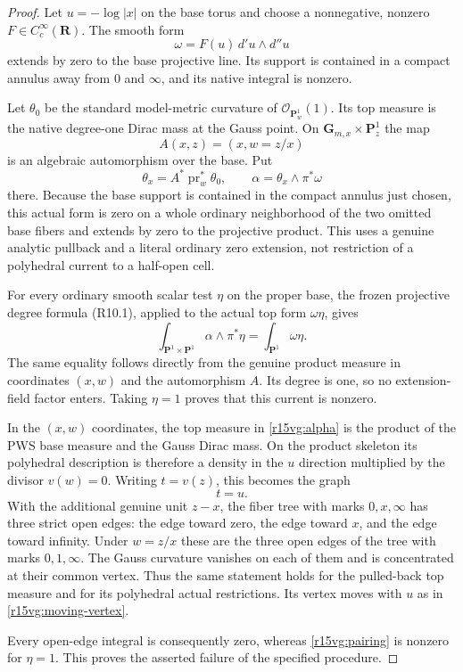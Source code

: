 \begin{proof}
Let $u=-\log|x|$ on the base torus and choose a nonnegative,
nonzero $F\in C_c^\infty(\mathbf R)$.  The smooth form
\[
                  \omega=F(u)\,d'u\wedge d''u
\tag{VG15.1}\label{r15vg:omega}
\]
extends by zero to the base projective line.  Its support is
contained in a compact annulus away from $0$ and $\infty$,
and its native integral is nonzero.

Let $\theta_0$ be the standard model-metric curvature of
$\mathcal O_{\mathbf P^1_w}(1)$.  Its top measure is the
native degree-one Dirac mass at the Gauss point.  On
$\mathbf G_{m,x}\times\mathbf P^1_z$ the map
\[
          A(x,z)=(x,w=z/x)
\tag{VG15.2}\label{r15vg:automorphism}
\]
is an algebraic automorphism over the base.  Put
\[
       \theta_x=A^*\operatorname{pr}_w^*\theta_0,
       \qquad \alpha=\theta_x\wedge\pi^*\omega
\tag{VG15.3}\label{r15vg:alpha}
\]
there.  Because the base support is contained in the compact
annulus just chosen, this actual form is zero on a whole
ordinary neighborhood of the two omitted base fibers and
extends by zero to the projective product.  This uses a
genuine analytic pullback and a literal ordinary zero
extension, not restriction of a polyhedral current to a
half-open cell.

For every ordinary smooth scalar test $\eta$ on the proper
base, the frozen projective degree formula (R10.1), applied
to the actual top form $\omega\eta$, gives
\[
 \int_{\mathbf P^1\times\mathbf P^1}
                  \alpha\wedge\pi^*\eta
       =\int_{\mathbf P^1}\omega\eta.
\tag{VG15.4}\label{r15vg:pairing}
\]
The same equality follows directly from the genuine product
measure in coordinates $(x,w)$ and the automorphism $A$.
Its degree is one, so no extension-field factor enters.
Taking $\eta=1$ proves that this current is nonzero.

In the $(x,w)$ coordinates, the top measure in
\eqref{r15vg:alpha} is the product of the PWS base measure
and the Gauss Dirac mass.  On the product skeleton its
polyhedral description is therefore a density in the
$u$ direction multiplied by the divisor $v(w)=0$.
Writing $t=v(z)$, this becomes the graph
\[
                              t=u.
\tag{VG15.5}\label{r15vg:moving-vertex}
\]
With the additional genuine unit $z-x$, the fiber tree with
marks $0,x,\infty$ has three strict open edges: the edge
toward zero, the edge toward $x$, and the edge toward
infinity.  Under $w=z/x$ these are the three open edges
of the tree with marks $0,1,\infty$.  The Gauss curvature
vanishes on each of them and is concentrated at their
common vertex.  Thus the same statement holds for the
pulled-back top measure and for its polyhedral actual
restrictions.  Its vertex moves with $u$ as in
\eqref{r15vg:moving-vertex}.

Every open-edge integral is consequently zero, whereas
\eqref{r15vg:pairing} is nonzero for $\eta=1$.
This proves the asserted failure of the specified procedure.
\end{proof}

